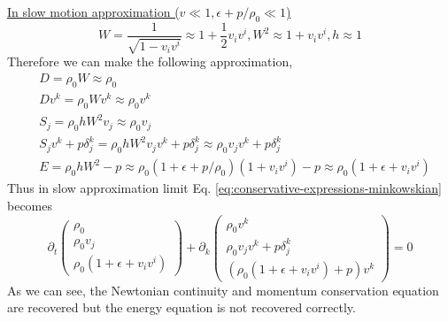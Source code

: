 \documentclass[10pt]{article}
\begin{document}
\begin{enumerate}
  \underline{In slow motion approximation ($v\ll 1, \epsilon + p/\rho_0 \ll 1$)}
  \begin{equation}
    \label{eq:D-in-slow-motion}
    W = \frac{1}{\sqrt{1 - v_i v^i}} \approx 1 + \frac{1}{2}v_i v^i, W^2\approx 1 + v_i v^i, h \approx 1
  \end{equation}
  Therefore we can make the following approximation,
  \begin{equation}
    \label{eq:slow-motion-minkowskian}
    \begin{aligned}
      & D = \rho_0 W \approx \rho_0 \\
      & Dv^k = \rho_0 W v^k \approx \rho_0 v^k\\
      & S_j = \rho_0 h W^2 v_j \approx \rho_0 v_j \\
      & S_jv^k + p \delta^k_j = \rho_0 h W^2 v_j v^k + p \delta^k_j \approx \rho_0 v_j v^k + p\delta^k_j\\
      & E = \rho_0 h W^2 - p \approx \rho_0 (1 + \epsilon + p/\rho_0)(1 + v_i v^i) - p \approx \rho_0(1 + \epsilon + v_i v^i)
    \end{aligned}
  \end{equation}
  Thus in slow approximation limit Eq. \eqref{eq:conservative-expressions-minkowskian} becomes
  \begin{equation}
    \label{eq:slow-motion-conservative-expressions-1}
    \partial_t
    \begin{pmatrix}
      \rho_0\\
      \rho_0 v_j \\
      \rho_0(1 + \epsilon + v_iv^i)
    \end{pmatrix} + \partial_k
    \begin{pmatrix}
      \rho_0 v^k \\
      \rho_0 v_j v^k + p\delta^k_j\\
      (\rho_0(1 + \epsilon + v_i v^i) + p)v^k
    \end{pmatrix} = 0
  \end{equation}
  As we can see, the Newtonian continuity and momentum conservation equation are recovered but the energy equation is not recovered correctly.


\end{enumerate}
\end{document}

